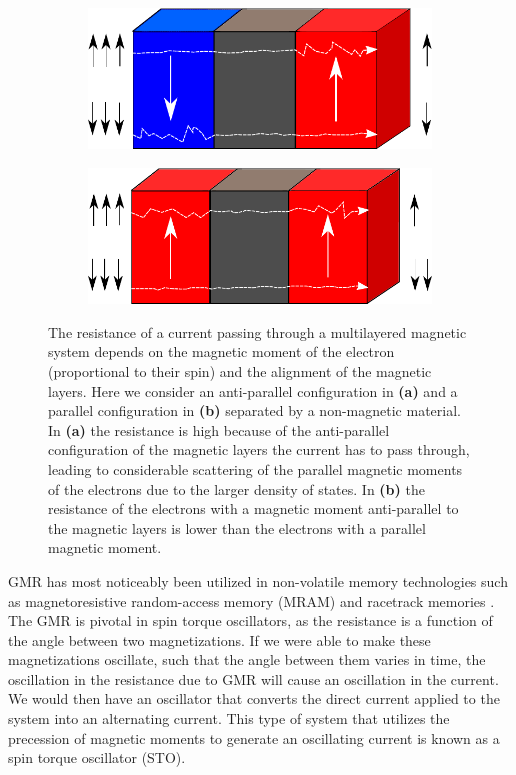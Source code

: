 \begin{figure}[h!]
\centering
  \begin{subfigure}[b]{.58\textwidth}
  \includegraphics[width=\linewidth]{Figures/GMR_APv2.pdf}
  \caption{}
  \label{fig:GMR_AP}
\end{subfigure}
\begin{subfigure}[b]{.6\textwidth}
  \includegraphics[width=\linewidth]{Figures/GMR_Pv2.pdf}
  \caption{}
  \label{fig:GMR_P}
\end{subfigure}
\caption{The resistance of a current passing through a multilayered magnetic system depends on the magnetic moment of the electron (proportional to their spin) and the alignment of the magnetic layers. Here we consider an anti-parallel configuration in \textbf{(a)} and a parallel configuration in \textbf{(b)} separated by a non-magnetic material. In \textbf{(a)} the resistance is high because of the anti-parallel configuration of the magnetic layers the current has to pass through, leading to considerable scattering of the parallel magnetic moments of the electrons due to the larger density of states. In \textbf{(b)} the resistance of the electrons with a magnetic moment anti-parallel to the magnetic layers is lower than the electrons with a parallel magnetic moment.}
\label{fig:GMR}
\end{figure}

GMR has most noticeably been utilized in non-volatile memory technologies such as magnetoresistive random-access memory (MRAM) \cite{Akerman2005} and racetrack memories \cite{Parkin2008}. The GMR is pivotal in spin torque oscillators, as the resistance is a function of the angle between two magnetizations. If we were able to make these magnetizations oscillate, such that the angle between them varies in time, the oscillation in the resistance due to GMR will cause an oscillation in the current. We would then have an oscillator that converts the direct current applied to the system into an alternating current. This type of system that utilizes the precession of magnetic moments to generate an oscillating current is known as a spin torque oscillator (STO).

